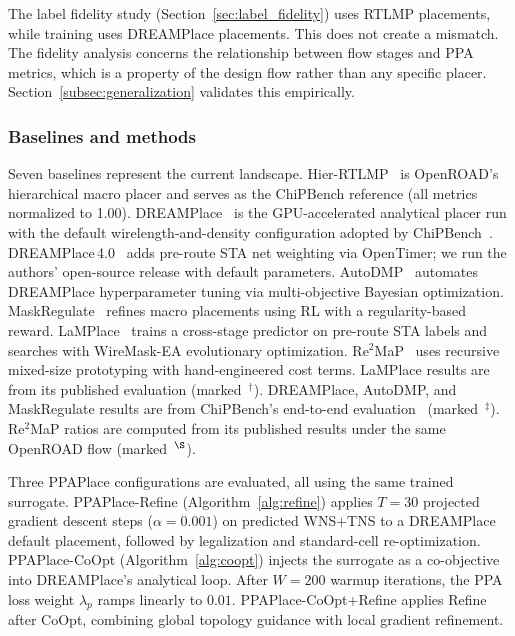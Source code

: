\documentclass[sigconf,anonymous,review,9pt]{acmart}
\begin{document}
The label fidelity study (Section~\ref{sec:label_fidelity}) uses
RTLMP placements, while training uses DREAMPlace placements. This
does not create a mismatch. The fidelity analysis concerns the
relationship between flow stages and PPA metrics, which is a property
of the design flow rather than any specific placer.
Section~\ref{subsec:generalization} validates this empirically.

\subsubsection{Baselines and methods}
Seven baselines represent the current landscape.
Hier-RTLMP~\cite{hierrtlmp2023} is OpenROAD's hierarchical macro
placer and serves as the ChiPBench reference (all metrics normalized
to 1.00). DREAMPlace~\cite{lin2019dreamplace} is the GPU-accelerated
analytical placer run with the default wirelength-and-density
configuration adopted by ChiPBench~\cite{chipbench2025}.
DREAMPlace\,4.0~\cite{dreamplace4} adds pre-route STA net weighting
via OpenTimer; we run the authors' open-source release with default parameters.
AutoDMP~\cite{autodmp2023} automates DREAMPlace hyperparameter tuning
via multi-objective Bayesian optimization.
MaskRegulate~\cite{maskregulate2024} refines macro placements using RL
with a regularity-based reward.
LaMPlace~\cite{lamplace2025} trains a cross-stage predictor on
pre-route STA labels and searches with WireMask-EA evolutionary
optimization.
Re$^2$MaP~\cite{re2map2025} uses recursive mixed-size prototyping
with hand-engineered cost terms.
LaMPlace results are from its published evaluation
(marked~$^\dagger$). DREAMPlace, AutoDMP, and MaskRegulate results
are from ChiPBench's end-to-end evaluation~\cite{chipbench2025}
(marked~$^\ddagger$). Re$^2$MaP ratios are computed from its
published results under the same OpenROAD flow (marked~$^\S$).

Three PPAPlace configurations are evaluated, all using the same
trained surrogate. PPAPlace-Refine (Algorithm~\ref{alg:refine})
applies $T{=}30$ projected gradient descent steps
($\alpha{=}0.001$) on predicted WNS$+$TNS to a DREAMPlace default
placement, followed by legalization and standard-cell re-optimization.
PPAPlace-CoOpt (Algorithm~\ref{alg:coopt}) injects the surrogate as a
co-objective into DREAMPlace's analytical loop. After $W{=}200$ warmup
iterations, the PPA loss weight $\lambda_p$ ramps linearly to $0.01$.
PPAPlace-CoOpt{+}Refine applies Refine after CoOpt, combining global
topology guidance with local gradient refinement.
\end{document}
